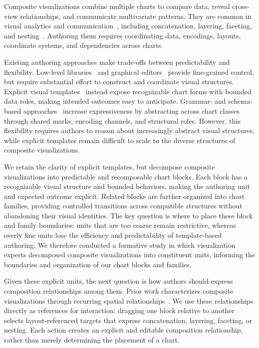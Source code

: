 

\maketitle

Composite visualizations combine multiple charts to compare data, reveal
cross-view relationships, and communicate multivariate patterns. They are
common in visual analytics and communication~\cite{vasurvey, Survey16,
deng2023survey, AI4VIS}, including concatenation, layering, faceting, and
nesting~\cite{javed2012exploring, Composite, vaid}. Authoring them requires
coordinating data, encodings, layouts, coordinate systems, and dependencies
across charts.

Existing authoring approaches make trade-offs between predictability
and flexibility. Low-level libraries~\cite{D3} and graphical editors~\cite{Lyra,DataIllustrator,Charticulator} provide
fine-grained control, but require substantial effort to construct and
coordinate visual structures.
Explicit visual templates~\cite{ManyEyes,
RAWGraphs} instead expose recognizable chart forms with bounded
data roles, making intended outcomes easy to anticipate. Grammar- and schema-based approaches~\cite{VegaLite,Tableau,ApacheECharts} increase expressiveness by
abstracting across chart classes through shared marks, encoding channels, and
structural roles. However, this
flexibility requires authors to reason about increasingly abstract visual
structures, while explicit templates remain difficult to scale to the diverse
structures of composite visualizations.

We retain the clarity of explicit templates, but decompose composite
visualizations into predictable and recomposable chart blocks. Each block has
a recognizable visual structure and bounded behaviors, making the authoring
unit and expected outcome explicit. Related blocks are further organized
into chart families, providing controlled transitions across compatible
structures without abandoning their visual identities. The key question is
where to place these block and family boundaries: units that are too coarse
remain restrictive, whereas overly fine units lose the efficiency and
predictability of template-based authoring. We therefore conducted a formative
study in which visualization experts decomposed composite visualizations into
constituent units, informing the boundaries and organization of our chart
blocks and families.


Given these explicit units, the next question is how authors should express
composition relationships among them. Prior work characterizes composite
visualizations through recurring spatial relationships~\cite{
javed2012exploring,Composite,vaid}. We use these relationships directly as
references for interaction: dragging one block relative to another selects
layout-referenced targets that express concatenation, layering, faceting, or
nesting. Each action creates an explicit and editable composition relationship,
rather than merely determining the placement of a chart.

